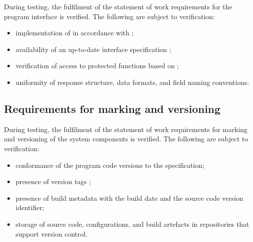 \documentclass[12pt,a4paper]{extarticle}
\begin{document}
\begin{hseExample}
During testing, the fulfilment of the statement of work requirements for the program interface is verified. The following are subject to verification:

\begin{itemize}[leftmargin=1.25cm]
    \item implementation of  in accordance with ;
    \item availability of an up-to-date interface specification ;
    \item verification of access to protected functions based on ;
    \item uniformity of response structure, data formats, and field naming conventions.
\end{itemize}
\end{hseExample}

\subsection{Requirements for marking and versioning}

\begin{hseExample}
During testing, the fulfilment of the statement of work requirements for marking and versioning of the system components is verified. The following are subject to verification:

\begin{itemize}[leftmargin=1.25cm]
    \item conformance of the program code versions to the  specification;
    \item presence of version tags ;
    \item presence of build metadata with the build date and the source code version identifier;
    \item storage of source code, configurations, and build artefacts in repositories that support version control.
\end{itemize}
\end{hseExample}

\clearpage
\end{document}
